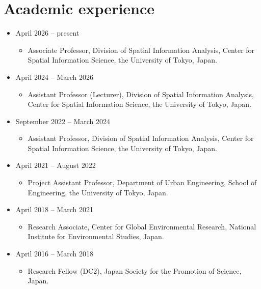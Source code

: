 \documentclass[
]{book}
\providecommand{\tightlist}{%
  \setlength{\itemsep}{0pt}\setlength{\parskip}{0pt}}
\begin{document}
\section*{Academic experience}\label{academic-experience}

\begin{itemize}
\tightlist
\item
  April 2026 -- present

  \begin{itemize}
  \tightlist
  \item
    Associate Professor,
    Division of Spatial Information Analysis, Center for Spatial Information Science, the University of Tokyo, Japan.
  \end{itemize}
\item
  April 2024 -- March 2026

  \begin{itemize}
  \tightlist
  \item
    Assistant Professor (Lecturer),
    Division of Spatial Information Analysis, Center for Spatial Information Science, the University of Tokyo, Japan.
  \end{itemize}
\item
  September 2022 -- March 2024

  \begin{itemize}
  \tightlist
  \item
    Assistant Professor,
    Division of Spatial Information Analysis, Center for Spatial Information Science, the University of Tokyo, Japan.
  \end{itemize}
\item
  April 2021 -- August 2022

  \begin{itemize}
  \tightlist
  \item
    Project Assistant Professor,
    Department of Urban Engineering, School of Engineering, the University of Tokyo, Japan.
  \end{itemize}
\item
  April 2018 -- March 2021

  \begin{itemize}
  \tightlist
  \item
    Research Associate,
    Center for Global Environmental Research, National Institute for Environmental Studies, Japan.
  \end{itemize}
\item
  April 2016 -- March 2018

  \begin{itemize}
  \tightlist
  \item
    Research Fellow (DC2),
    Japan Society for the Promotion of Science, Japan.
  \end{itemize}
\end{itemize}
\end{document}
